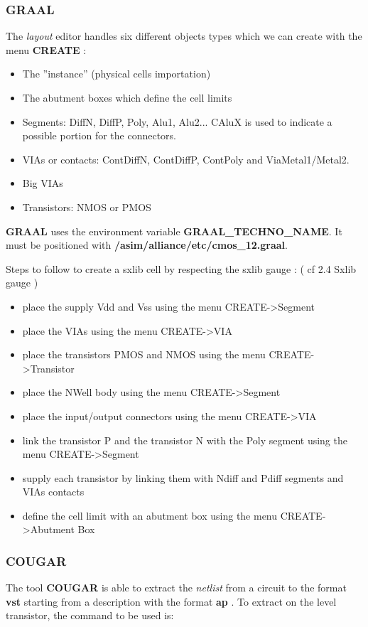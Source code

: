 \documentclass[12pt]{article}
\begin{document}
\subsubsection{GRAAL}
    The {\it layout } editor \/handles six different objects types which we can create
    with the menu { \bf CREATE }:
\begin{itemize}\itemsep=-.4ex
\item   The ''instance'' (physical cells importation)
\item   The abutment boxes which define the cell limits 
\item   Segments: DiffN, DiffP, Poly, Alu1, Alu2... CAluX is used to indicate
        a possible portion for the connectors.
\item   VIAs or contacts: ContDiffN, ContDiffP, ContPoly and
    ViaMetal1/Metal2.
\item   Big VIAs
\item   Transistors: NMOS or PMOS
\end{itemize}

{\bf GRAAL} uses the environment variable {\bf
GRAAL\_TECHNO\_NAME}. It must be positioned with
{\bf/asim/alliance/etc/cmos\_12.graal}.

Steps to follow to create a sxlib cell by respecting the sxlib gauge :
( cf 2.4 Sxlib gauge ) 
\begin{itemize}\itemsep=-.4ex
\item	place the supply Vdd and Vss using the menu CREATE->Segment
\item	place the VIAs using the menu CREATE->VIA
\item 	place the transistors PMOS and NMOS using the menu CREATE->Transistor
\item	place the NWell body using the menu CREATE->Segment
\item 	place the input/output connectors using the menu CREATE->VIA
\item	link the transistor P and the transistor N with the Poly segment using the menu CREATE->Segment
\item	supply each transistor by linking them with Ndiff and Pdiff segments and VIAs contacts
\item 	define the cell limit with an abutment box using the menu CREATE->Abutment Box
\end{itemize} 

\subsubsection{COUGAR}
The tool { \bf COUGAR } is able to extract the { \it netlist } from
a circuit to the format { \bf vst } starting from a description
with the format { \bf ap }. To extract on the level transistor,
the command to be used is:
\end{document}
